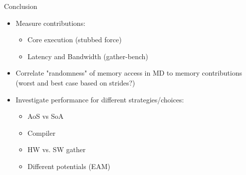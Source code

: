 \documentclass[aspectratio=169,t]{beamer}
\begin{document}
  \begin{frame}[fragile]{Conclusion}
    \begin{itemize}
      \item Measure contributions:
      \begin{itemize}
        \item Core execution (stubbed force)
        \item Latency and Bandwidth (gather-bench)
      \end{itemize}
      \item Correlate "randomness" of memory access in MD to memory contributions (worst and best case based on strides?)
      \item Investigate performance for different strategies/choices:
      \begin{itemize}
        \item AoS vs SoA
        \item Compiler
        \item HW vs. SW gather
        \item Different potentials (EAM)
      \end{itemize}
    \end{itemize}
  \end{frame}




  { %

  }
\end{document}
